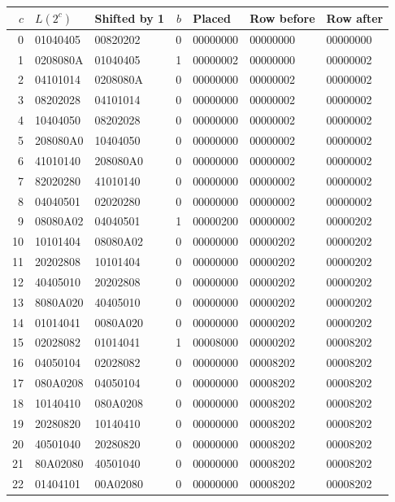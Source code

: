 \begingroup\small\begin{longtable}{rllrlll}\toprule
$c$ & $L(2^c)$ & Shifted by 1 & $b$ & Placed & Row before & Row after\\\midrule
\endhead
0 & 01040405 & 00820202 & 0 & 00000000 & 00000000 & 00000000\\
1 & 0208080A & 01040405 & 1 & 00000002 & 00000000 & 00000002\\
2 & 04101014 & 0208080A & 0 & 00000000 & 00000002 & 00000002\\
3 & 08202028 & 04101014 & 0 & 00000000 & 00000002 & 00000002\\
4 & 10404050 & 08202028 & 0 & 00000000 & 00000002 & 00000002\\
5 & 208080A0 & 10404050 & 0 & 00000000 & 00000002 & 00000002\\
6 & 41010140 & 208080A0 & 0 & 00000000 & 00000002 & 00000002\\
7 & 82020280 & 41010140 & 0 & 00000000 & 00000002 & 00000002\\
8 & 04040501 & 02020280 & 0 & 00000000 & 00000002 & 00000002\\
9 & 08080A02 & 04040501 & 1 & 00000200 & 00000002 & 00000202\\
10 & 10101404 & 08080A02 & 0 & 00000000 & 00000202 & 00000202\\
11 & 20202808 & 10101404 & 0 & 00000000 & 00000202 & 00000202\\
12 & 40405010 & 20202808 & 0 & 00000000 & 00000202 & 00000202\\
13 & 8080A020 & 40405010 & 0 & 00000000 & 00000202 & 00000202\\
14 & 01014041 & 0080A020 & 0 & 00000000 & 00000202 & 00000202\\
15 & 02028082 & 01014041 & 1 & 00008000 & 00000202 & 00008202\\
16 & 04050104 & 02028082 & 0 & 00000000 & 00008202 & 00008202\\
17 & 080A0208 & 04050104 & 0 & 00000000 & 00008202 & 00008202\\
18 & 10140410 & 080A0208 & 0 & 00000000 & 00008202 & 00008202\\
19 & 20280820 & 10140410 & 0 & 00000000 & 00008202 & 00008202\\
20 & 40501040 & 20280820 & 0 & 00000000 & 00008202 & 00008202\\
21 & 80A02080 & 40501040 & 0 & 00000000 & 00008202 & 00008202\\
22 & 01404101 & 00A02080 & 0 & 00000000 & 00008202 & 00008202\\

\end{longtable}
